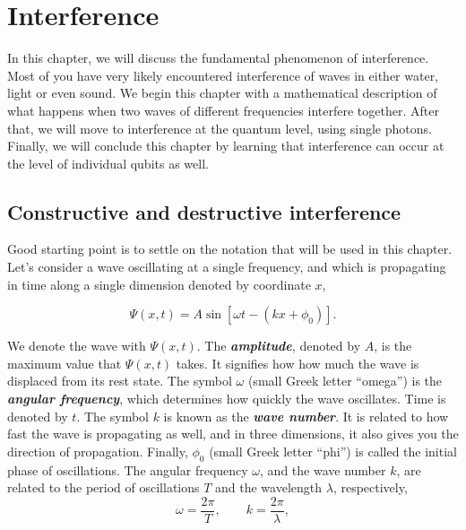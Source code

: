 \chapter{Interference}
\label{sec:6_interference}

In this chapter, we will discuss the fundamental phenomenon of interference.
Most of you have very likely encountered interference of waves in either water, light or even sound.
We begin this chapter with a mathematical description of what happens when two waves of different frequencies interfere together.
After that, we will move to interference at the quantum level, using single photons.
Finally, we will conclude this chapter by learning that interference can occur at the level of individual qubits as well.


\section{Constructive and destructive interference}
\label{sec:6-1_constructive_and_destructive_interference}


Good starting point is to settle on the notation that will be used in this chapter.
Let's consider a wave oscillating at a single frequency, and which is propagating in time along a single dimension denoted by coordinate $x$,

\begin{equation}
    \Psi(x,t) = A \sin [\omega t-(k x+\phi_0)].
    \label{eq:simple_wave}
\end{equation}

We denote the wave with $\Psi(x,t)$.
The \textbf{\emph{amplitude}}, denoted by $A$, is the maximum value that $\Psi(x,t)$ takes.
It signifies how how much the wave is displaced from its rest state.
The symbol $\omega$ (small Greek letter ``omega'') is the \textbf{\emph{angular frequency}}, which determines how quickly the wave oscillates.
Time is denoted by $t$.
The symbol $k$ is known as the \textbf{\emph{wave number}}.
It is related to how fast the wave is propagating as well, and in three dimensions, it also gives you the direction of propagation.
Finally, $\phi_0$ (small Greek letter ``phi'') is called the initial phase of oscillations.
The angular frequency $\omega$, and the wave number $k$, are related to the period of oscillations $T$ and the wavelength $\lambda$, respectively,
\begin{equation}
    \omega=\frac{2 \pi}{T}, \qquad k=\frac{2 \pi}{\lambda},
    \label{eq:freq-period_k-wavelength}
\end{equation}

